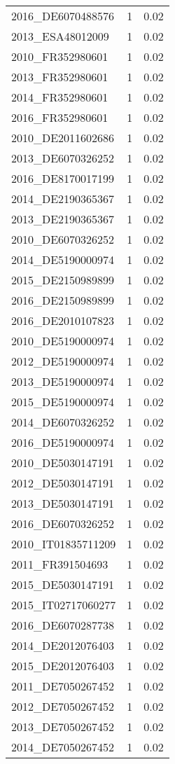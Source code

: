 \begin{table*}[htbp]
\begin{tabular}{lrr}
2016_DE6070488576 & 1 & 0.02 \\
2013_ESA48012009 & 1 & 0.02 \\
2010_FR352980601 & 1 & 0.02 \\
2013_FR352980601 & 1 & 0.02 \\
2014_FR352980601 & 1 & 0.02 \\
2016_FR352980601 & 1 & 0.02 \\
2010_DE2011602686 & 1 & 0.02 \\
2013_DE6070326252 & 1 & 0.02 \\
2016_DE8170017199 & 1 & 0.02 \\
2014_DE2190365367 & 1 & 0.02 \\
2013_DE2190365367 & 1 & 0.02 \\
2010_DE6070326252 & 1 & 0.02 \\
2014_DE5190000974 & 1 & 0.02 \\
2015_DE2150989899 & 1 & 0.02 \\
2016_DE2150989899 & 1 & 0.02 \\
2016_DE2010107823 & 1 & 0.02 \\
2010_DE5190000974 & 1 & 0.02 \\
2012_DE5190000974 & 1 & 0.02 \\
2013_DE5190000974 & 1 & 0.02 \\
2015_DE5190000974 & 1 & 0.02 \\
2014_DE6070326252 & 1 & 0.02 \\
2016_DE5190000974 & 1 & 0.02 \\
2010_DE5030147191 & 1 & 0.02 \\
2012_DE5030147191 & 1 & 0.02 \\
2013_DE5030147191 & 1 & 0.02 \\
2016_DE6070326252 & 1 & 0.02 \\
2010_IT01835711209 & 1 & 0.02 \\
2011_FR391504693 & 1 & 0.02 \\
2015_DE5030147191 & 1 & 0.02 \\
2015_IT02717060277 & 1 & 0.02 \\
2016_DE6070287738 & 1 & 0.02 \\
2014_DE2012076403 & 1 & 0.02 \\
2015_DE2012076403 & 1 & 0.02 \\
2011_DE7050267452 & 1 & 0.02 \\
2012_DE7050267452 & 1 & 0.02 \\
2013_DE7050267452 & 1 & 0.02 \\
2014_DE7050267452 & 1 & 0.02 \\

\end{tabular}
\end{table*}

